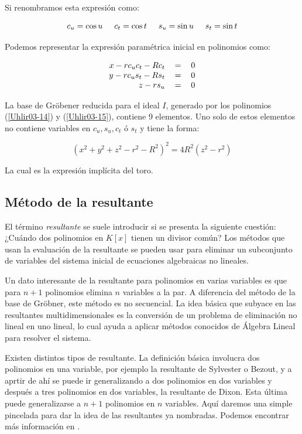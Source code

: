 Si renombramos esta expresión como:

\begin{equation}\label{Uhlir03-14}
c_u = \cos u \hspace{0.5cm} c_t = \cos t \hspace{0.5cm} s_u = \sin u \hspace{0.5cm} s_t = \sin t
\end{equation}

Podemos representar la expresión paramétrica inicial en polinomios como:

\begin{equation}\label{Uhlir03-15}
\begin{tabular}{r c c}
$x - r c_u c_t - R c_t$ & $=$ & $0$ \\
$y - r c_u s_t - R s_t$ & $=$ & $0$ \\
$z - r s_u$ & $=$ & $0$
\end{tabular}
\end{equation}

La base de Gröbener reducida para el ideal $I$, generado por los polinomios (\ref{Uhlir03-14}) y (\ref{Uhlir03-15}), contiene 9 elementos. Uno solo de estos elementos no contiene variables en $c_u, s_u, c_t \text{ ó } s_t$ y tiene la forma:

$$(x^2 + y^2 + z^2 - r^2 - R^2)^2 = 4 R^2 (z^2 - r^2)$$

La cual es la expresión implícita del toro.

\subsection{Método de la resultante}

El término { \em resultante} se suele introducir si se presenta la siguiente cuestión: ¿Cuándo dos polinomios en $K[x]$ tienen un divisor común? Los métodos que usan la evaluación de la resultante se pueden usar para eliminar un subconjunto de variables del sistema inicial de ecuaciones algebraicas no lineales.
\par Un dato interesante de la resultante para polinomios en varias variables es que para $n+1$ polinomios elimina $n$ variables a la par. A diferencia del método de la base de Gröbner, este método es no secuencial. La idea básica que subyace en las resultantes multidimensionales es la conversión de un problema de eliminación no lineal en uno lineal, lo cual ayuda a aplicar métodos conocidos de Álgebra Lineal para resolver el sistema.
\par Existen distintos tipos de resultante. La definición básica involucra dos polinomios en una variable, por ejemplo la resultante de Sylvester o Bezout, y a aprtir de ahí se puede ir generalizando a dos polinomios en dos variables y después a tres polinomios en dos variables, la resultante de Dixon. Esta última puede generalizarse a $n+1$ polinomios en $n$ variables. Aquí daremos una simple pincelada para dar la idea de las resultantes ya nombradas. Podemos encontrar más información en \cite{Berchtold00}.

